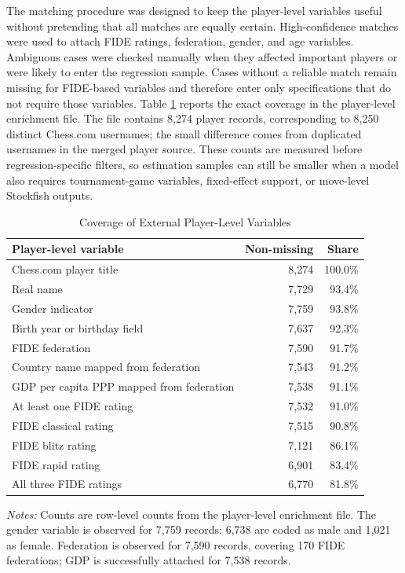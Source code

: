 The matching procedure was designed to keep the player-level variables useful without pretending that all matches are equally certain. High-confidence matches were used to attach FIDE ratings, federation, gender, and age variables. Ambiguous cases were checked manually when they affected important players or were likely to enter the regression sample. Cases without a reliable match remain missing for FIDE-based variables and therefore enter only specifications that do not require those variables. Table \ref{tab:player-external-coverage} reports the exact coverage in the player-level enrichment file. The file contains 8,274 player records, corresponding to 8,250 distinct Chess.com usernames; the small difference comes from duplicated usernames in the merged player source. These counts are measured before regression-specific filters, so estimation samples can still be smaller when a model also requires tournament-game variables, fixed-effect support, or move-level Stockfish outputs.

\begin{table}[H]
\centering
\caption{Coverage of External Player-Level Variables}
\label{tab:player-external-coverage}
\begin{tabular}{@{}p{}rr@{}}
\toprule
Player-level variable & Non-missing & Share \\
\midrule
Chess.com player title & 8,274 & 100.0\% \\
Real name & 7,729 & 93.4\% \\
Gender indicator & 7,759 & 93.8\% \\
Birth year or birthday field & 7,637 & 92.3\% \\
FIDE federation & 7,590 & 91.7\% \\
Country name mapped from federation & 7,543 & 91.2\% \\
GDP per capita PPP mapped from federation & 7,538 & 91.1\% \\
At least one FIDE rating & 7,532 & 91.0\% \\
FIDE classical rating & 7,515 & 90.8\% \\
FIDE blitz rating & 7,121 & 86.1\% \\
FIDE rapid rating & 6,901 & 83.4\% \\
All three FIDE ratings & 6,770 & 81.8\% \\
\bottomrule
\end{tabular}
\vspace{0.35em}
\begin{minipage}{0.92\textwidth}
\footnotesize
\emph{Notes:} Counts are row-level counts from the player-level enrichment file. The gender variable is observed for 7,759 records: 6,738 are coded as male and 1,021 as female. Federation is observed for 7,590 records, covering 170 FIDE federations; GDP is successfully attached for 7,538 records.
\end{minipage}
\end{table}

